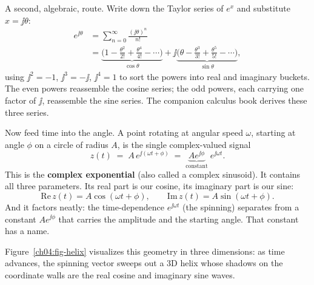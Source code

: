 \begin{focusbox}
A second, algebraic, route. Write down the Taylor series of $e^{x}$ and substitute $x = \jj\theta$:
\begin{align*}
  e^{\jj\theta} &= \sum_{n=0}^{\infty}\frac{(\jj\theta)^n}{n!} \\
   &= \underbrace{\Big(1 - \frac{\theta^2}{2!} + \frac{\theta^4}{4!} - \cdots\Big)}_{\cos\theta}
   + \jj\underbrace{\Big(\theta - \frac{\theta^3}{3!} + \frac{\theta^5}{5!} - \cdots\Big)}_{\sin\theta},
\end{align*}
using $\jj^2 = -1$, $\jj^3 = -\jj$, $\jj^4 = 1$ to sort the powers into real and imaginary buckets.
The even powers reassemble the cosine series; the odd powers, each carrying one factor of $\jj$,
reassemble the sine series. The companion calculus book derives these three series.
\end{focusbox}

Now feed time into the angle. A point rotating at angular speed $\omega$, starting at angle $\phi$
on a circle of radius $A$, is the single complex-valued signal
\[
  z(t) \;=\; A\,e^{\jj(\omega t + \phi)} \;=\; \underbrace{A e^{\jj\phi}}_{\text{constant}}\; e^{\jj\omega t}.
\]
This is the \textbf{complex exponential} (also called a complex sinusoid). It contains all three
parameters. Its real part is our cosine, its imaginary part is our sine:
\[
  \mathrm{Re}\,z(t) = A\cos(\omega t + \phi), \qquad \mathrm{Im}\,z(t) = A\sin(\omega t + \phi).
\]
And it factors neatly: the time-dependence $e^{\jj\omega t}$ (the spinning) separates from a
constant $Ae^{\jj\phi}$ that carries the amplitude and the starting angle. That constant has a name.

Figure~\ref{ch04:fig-helix} visualizes this geometry in three dimensions: as time advances, the
spinning vector sweeps out a 3D helix whose shadows on the coordinate walls are the real cosine and
imaginary sine waves.

